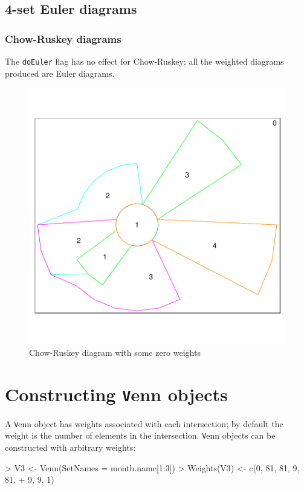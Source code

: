 \documentclass[a4paper]{article}
\begin{document}
\subsection{4-set Euler diagrams}
\subsubsection{Chow-Ruskey diagrams}


The \texttt{doEuler} flag has no effect for Chow-Ruskey; all
the weighted diagrams produced are Euler diagrams.

\begin{figure}[H]\begin{center}
\includegraphics{Vennfig-CR4fig}
\caption{Chow-Ruskey diagram with some zero weights}
\end{center}\end{figure}

\clearpage
\newpage
\section{Constructing {\texttt Venn} objects}
\label{sec:venn}
A {\texttt Venn} object has weights associated with each intersection; by default
the weight is the number of elements in the intersection.
{\texttt Venn} objects can be constructed with arbitrary weights:
\begin{Schunk}
\begin{Sinput}
> V3 <- Venn(SetNames = month.name[1:3])
> Weights(V3) <- c(0, 81, 81, 9, 81, 
+     9, 9, 1)
\end{Sinput}
\end{Schunk}
\end{document}
